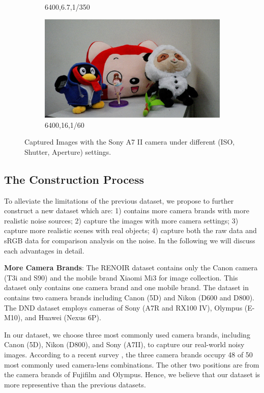 \begin{figure}
\begin{subfigure}[t]{0.32\textwidth}
		\caption{6400,6.7,1/350}
    \end{subfigure}
    \hfill
    \begin{subfigure}[t]{0.32\textwidth}
        \centering
        \includegraphics[width=1\textwidth]{images/dataset/6400_16_1-60.jpg}
		\caption{6400,16,1/60}
    \end{subfigure}
    \caption{Captured Images with the Sony A7 II camera under different (ISO, Shutter, Aperture) settings.}
    \label{fig6-1}
\end{figure}


\subsection{The Construction Process}

To alleviate the limitations of the previous dataset, we propose to further construct a new dataset which are: 1) contains more camera brands with more realistic noise sources;  2) capture the images with more camera settings; 3) capture more realistic scenes with real objects; 4) capture both the raw data and sRGB data for comparison analysis on the noise. In the following we will discuss each advantages in detail.

\textbf{More Camera Brands}: The RENOIR dataset \cite{RENOIR2014} contains only the Canon camera (T3i and S90) and the mobile brand Xiaomi Mi3 for image collection. This dataset only contains one camera brand and one mobile brand. The dataset in \cite{crosschannel2016} contains two camera brands including Canon (5D) and Nikon (D600 and D800). The DND dataset \cite{dnd2017} employs cameras of Sony (A7R and RX100 IV),  Olympus (E-M10), and Huawei (Nexus 6P).

In our dataset, we choose three most commonly used camera brands, including Canon (5D), Nikon (D800), and Sony (A7II), to capture our real-world noisy images. According to a recent survey \cite{commoncamera}, the three camera brands occupy 48 of 50 most commonly used camera-lens combinations. The other two positions are from the camera brands of Fujifilm and Olympus. Hence, we believe that our dataset is more representive than the previous datasets.

